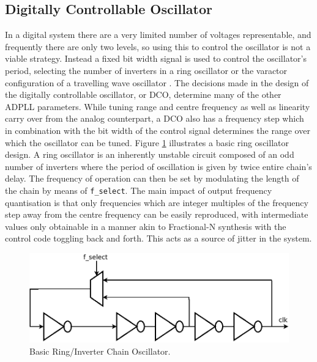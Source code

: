 \documentclass[11pt,english,british]{report}
\begin{document}
\subsection{Digitally Controllable Oscillator}
In a digital system there are a very limited number of voltages representable, and frequently there are only two levels, so using this to control the oscillator is not a viable strategy. Instead a fixed bit width signal is used to control the oscillator's period, selecting the number of inverters in a ring oscillator or the varactor configuration of a travelling wave oscillator \cite{chen2011rotary}. The decisions made in the design of the digitally controllable oscillator, or DCO, determine many of the other ADPLL parameters. While tuning range and centre frequency as well as linearity carry over from the analog counterpart, a DCO also has a frequency step which in combination with the bit width of the control signal determines the range over which the oscillator can be tuned. Figure \ref{fig:my_ring} illustrates a basic ring oscillator design. A ring oscillator is an inherently unstable circuit composed of an odd number of inverters where the period of oscillation is given by twice entire chain's delay. The frequency of operation can then be set by modulating the length of the chain by means of \texttt{f\_select}. The main impact of output frequency quantisation is that only frequencies which are integer multiples of the frequency step away from the centre frequency can be easily reproduced, with intermediate values only obtainable in a manner akin to Fractional-N synthesis with the control code toggling back and forth. This acts as a source of jitter in the system.
\begin{figure}[h]
	\centering
	\includegraphics[scale=0.275]{../inverter_chain}
	\caption{Basic Ring/Inverter Chain Oscillator.}
	\label{fig:my_ring}
\end{figure}
\end{document}
